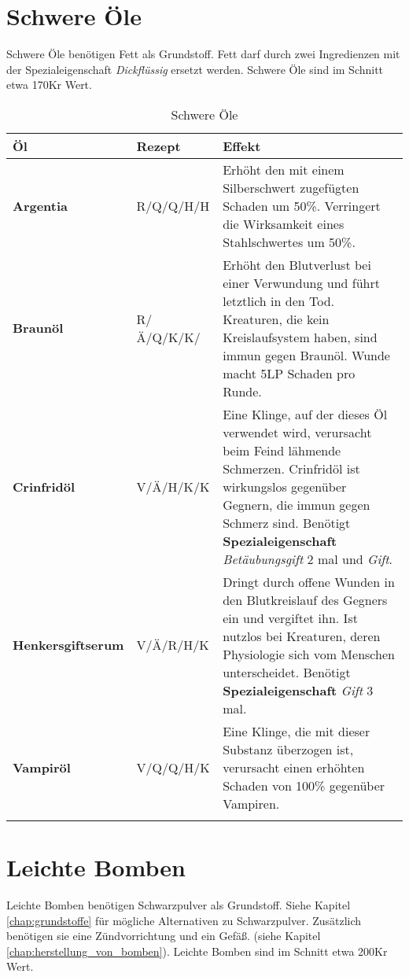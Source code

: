 \section{Schwere Öle}
Schwere Öle benötigen Fett als Grundstoff. Fett darf durch zwei Ingredienzen mit der Spezialeigenschaft \textit{Dickflüssig} ersetzt werden. Schwere Öle sind im Schnitt etwa 170Kr Wert.

\begin{longtable}{|p{4cm}|p{}|p{9cm}|}
\hline
\textbf{Öl} & \textbf{Rezept} & \textbf{Effekt} \\ \hline

\textbf{Argentia} & R/Q/Q/H/H & Erhöht den mit einem Silberschwert zugefügten Schaden um 50\%. Verringert die Wirksamkeit eines Stahlschwertes um 50\%. \\ \hline

\textbf{Braunöl} & R/Ä/Q/K/K/ & Erhöht den Blutverlust bei einer Verwundung und führt letztlich in den Tod. Kreaturen, die kein Kreislaufsystem haben, sind immun gegen Braunöl. Wunde macht 5LP Schaden pro Runde. \\ \hline

\textbf{Crinfridöl} & V/Ä/H/K/K & Eine Klinge, auf der dieses Öl verwendet wird, verursacht beim Feind lähmende Schmerzen. Crinfridöl ist wirkungslos gegenüber Gegnern, die immun gegen Schmerz sind. Benötigt \textbf{Spezialeigenschaft} \textit{Betäubungsgift} 2 mal und \textit{Gift}. \\ \hline

\textbf{Henkersgiftserum} & V/Ä/R/H/K & Dringt durch offene Wunden in den Blutkreislauf des Gegners ein und vergiftet ihn. Ist nutzlos bei Kreaturen, deren Physiologie sich vom Menschen unterscheidet. Benötigt \textbf{Spezialeigenschaft} \textit{Gift} 3 mal. \\ \hline

\textbf{Vampiröl} & V/Q/Q/H/K & Eine Klinge, die mit dieser Substanz überzogen ist, verursacht einen erhöhten Schaden von 100\% gegenüber Vampiren.  \\ \hline

\caption{Schwere Öle}
\label{tab:schwere_oele}
\end{longtable}



\section{Leichte Bomben}
Leichte Bomben benötigen Schwarzpulver als Grundstoff. Siehe Kapitel \ref{chap:grundstoffe} für mögliche Alternativen zu Schwarzpulver. Zusätzlich benötigen sie eine Zündvorrichtung und ein Gefäß. (siehe Kapitel \ref{chap:herstellung_von_bomben}). Leichte Bomben sind im Schnitt etwa 200Kr Wert.

